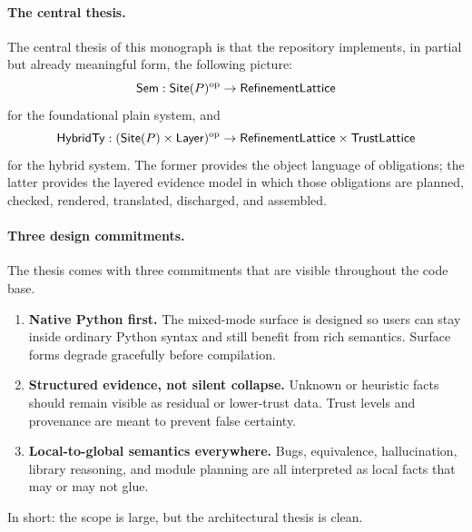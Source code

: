 \paragraph{The central thesis.}
The central thesis of this monograph is that the repository implements, in partial but
already meaningful form, the following picture:
\[
  \mathsf{Sem} : \mathsf{Site}(P)^{\mathrm{op}} \to \mathsf{RefinementLattice}
\]
for the foundational plain system, and
\[
  \mathsf{HybridTy} : (\mathsf{Site}(P) \times \mathsf{Layer})^{\mathrm{op}} \to \mathsf{RefinementLattice} \times \mathsf{TrustLattice}
\]
for the hybrid system. The former provides the object language of obligations; the latter
provides the layered evidence model in which those obligations are planned, checked,
rendered, translated, discharged, and assembled.

\paragraph{Three design commitments.}
The thesis comes with three commitments that are visible throughout the code base.
\begin{enumerate}[leftmargin=*, itemsep=0.5em]
  \item \textbf{Native Python first.} The mixed-mode surface is designed so users can stay
  inside ordinary Python syntax and still benefit from rich semantics. Surface forms
  degrade gracefully before compilation.
  \item \textbf{Structured evidence, not silent collapse.} Unknown or heuristic facts should
  remain visible as residual or lower-trust data. Trust levels and provenance are meant to
  prevent false certainty.
  \item \textbf{Local-to-global semantics everywhere.} Bugs, equivalence, hallucination,
  library reasoning, and module planning are all interpreted as local facts that may or
  may not glue.
\end{enumerate}

In short: the scope is large, but the architectural thesis is clean.
